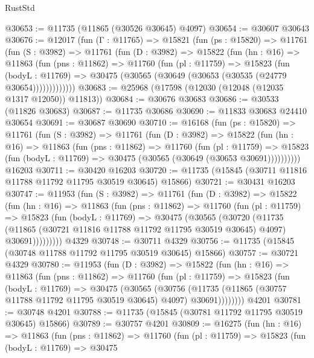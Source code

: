 \begin{lexlean}{RustStd}
\begin{coremodule}
@30653 := @11735 (@11865 (@30526 @30645) @4097)
@30654 := @30607 @30643
@30676 := @12017
    (fun (Γ : @11765) =>
    @15821
      (fun (ps : @15820) =>
      @11761
        (fun (S : @3982) =>
        @11761
          (fun (D : @3982) =>
          @15822
            (fun (hn : @16) =>
            @11863
              (fun (pns : @11862) =>
              @11760
                (fun (pl : @11759) =>
                @15823
                  (fun (bodyL : @11769) =>
                  @30475 (@30565 (@30649 (@30653 (@30535 (@24779 @30654)))))))))))))
@30683 := @25968 (@17598 (@12030 (@12048 (@12035 @1317 @12050)) @11813))
@30684 := @30676 @30683
@30686 := @30533 (@11826 @30683)
@30687 := @11735 @30686
@30690 := @11833 @30683 @24410 @30654
@30691 := @30687 @30690
@30710 := @16168
    (fun (ps : @15820) =>
    @11761
      (fun (S : @3982) =>
      @11761
        (fun (D : @3982) =>
        @15822
          (fun (hn : @16) =>
          @11863
            (fun (pns : @11862) =>
            @11760
              (fun (pl : @11759) =>
              @15823 (fun (bodyL : @11769) => @30475 (@30565 (@30649 (@30653 @30691))))))))))
    @16203
@30711 := @30420 @16203
@30720 := @11735 (@15845 (@30711 @11816 @11788 @11792 @11795 @30519 @30645) @15866)
@30721 := @30431 @16203
@30747 := @11953
    (fun (S : @3982) =>
    @11761
      (fun (D : @3982) =>
      @15822
        (fun (hn : @16) =>
        @11863
          (fun (pns : @11862) =>
          @11760
            (fun (pl : @11759) =>
            @15823
              (fun (bodyL : @11769) =>
              @30475
                (@30565
                  (@30720
                    (@11735
                      (@11865 (@30721 @11816 @11788 @11792 @11795 @30519 @30645) @4097)
                      @30691)))))))))
    @4329
@30748 := @30711 @4329
@30756 := @11735 (@15845 (@30748 @11788 @11792 @11795 @30519 @30645) @15866)
@30757 := @30721 @4329
@30780 := @11953
    (fun (D : @3982) =>
    @15822
      (fun (hn : @16) =>
      @11863
        (fun (pns : @11862) =>
        @11760
          (fun (pl : @11759) =>
          @15823
            (fun (bodyL : @11769) =>
            @30475
              (@30565
                (@30756
                  (@11735 (@11865 (@30757 @11788 @11792 @11795 @30519 @30645) @4097) @30691))))))))
    @4201
@30781 := @30748 @4201
@30788 := @11735 (@15845 (@30781 @11792 @11795 @30519 @30645) @15866)
@30789 := @30757 @4201
@30809 := @16275
    (fun (hn : @16) =>
    @11863
      (fun (pns : @11862) =>
      @11760
        (fun (pl : @11759) =>
        @15823
          (fun (bodyL : @11769) =>
          @30475

\end{coremodule}
\end{lexlean}
